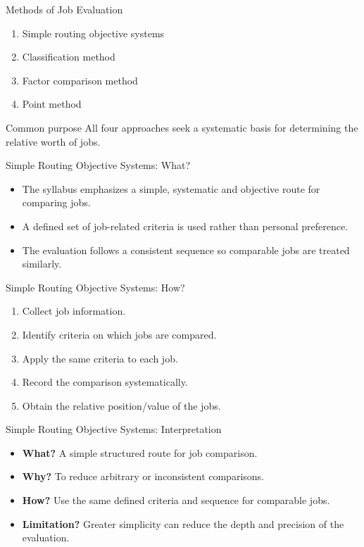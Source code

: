 \documentclass[aspectratio=169,10pt]{beamer}
\begin{document}
\begin{frame}{Methods of Job Evaluation}
\begin{enumerate}
  \item Simple routing objective systems
  \item Classification method
  \item Factor comparison method
  \item Point method
\end{enumerate}
\vspace{0.25cm}
\begin{block}{Common purpose}
All four approaches seek a systematic basis for determining the relative worth of jobs.
\end{block}
\end{frame}

\begin{frame}{Simple Routing Objective Systems: What?}
\begin{itemize}
  \item The syllabus emphasizes a simple, systematic and objective route for comparing jobs.
  \item A defined set of job-related criteria is used rather than personal preference.
  \item The evaluation follows a consistent sequence so comparable jobs are treated similarly.
\end{itemize}
\end{frame}

\begin{frame}{Simple Routing Objective Systems: How?}
\begin{enumerate}
  \item Collect job information.
  \item Identify criteria on which jobs are compared.
  \item Apply the same criteria to each job.
  \item Record the comparison systematically.
  \item Obtain the relative position/value of the jobs.
\end{enumerate}
\vspace{0.25cm}
\end{frame}

\begin{frame}{Simple Routing Objective Systems: Interpretation}
\begin{itemize}
  \item \textbf{What?} A simple structured route for job comparison.
  \item \textbf{Why?} To reduce arbitrary or inconsistent comparisons.
  \item \textbf{How?} Use the same defined criteria and sequence for comparable jobs.
  \item \textbf{Limitation?} Greater simplicity can reduce the depth and precision of the evaluation.
\end{itemize}
\end{frame}
\end{document}
